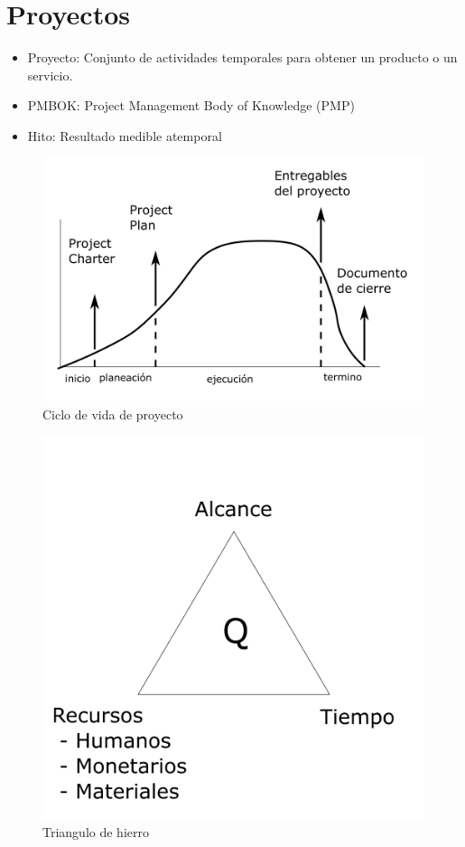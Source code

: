 \section{Proyectos}
\begin{itemize}
    \item Proyecto: Conjunto de actividades temporales para obtener un producto o un servicio. 
    \item PMBOK: Project Management Body of Knowledge (PMP)
    \item Hito: Resultado medible atemporal 
\end{itemize}

\begin{figure}[h!]
    \centering
        \includegraphics[scale=0.20]{Proyecto Integrador Figuras/04 Ciclo de Vida de Proyecto.png}
        \caption{Ciclo de vida de proyecto}
\end{figure}

\begin{figure}[h!]
    \centering
        \includegraphics[scale=0.20]{Proyecto Integrador Figuras/05 Triangulo de Hierro.png}
        \caption{Triangulo de hierro}
\end{figure}